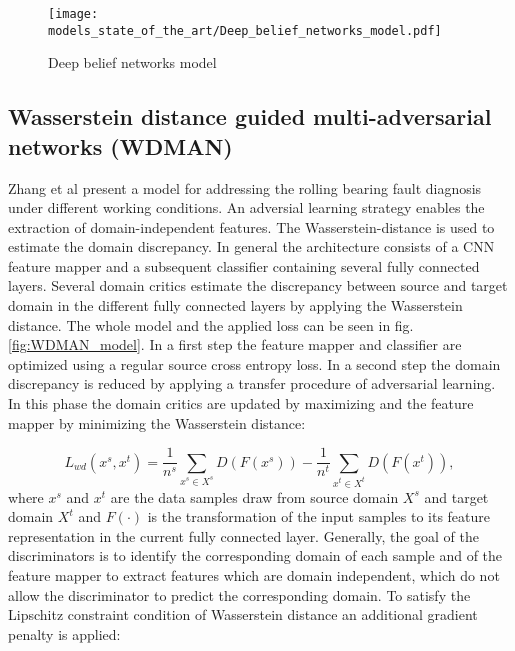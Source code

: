 {\begin{figure}[p]
  \centering
  \texttt{[image: models\_state\_of\_the\_art/Deep\_belief\_networks\_model.pdf]}
  \caption{Deep belief networks model \cite{Zhang2017}}
  \label{fig:Deep_belief_networks_model}
\end{figure}


\subsection{Wasserstein distance guided multi-adversarial networks (WDMAN)}
 Zhang et al \cite{Zhang2019} present a model for addressing the rolling bearing fault diagnosis under different working conditions. An adversial learning strategy enables the extraction of domain-independent features. The Wasserstein-distance is used to estimate the domain discrepancy. In general the architecture consists of a CNN feature mapper and a subsequent classifier containing several fully connected layers. Several domain critics estimate the discrepancy between source and target domain in the different fully connected layers by applying the Wasserstein distance. The whole model and the applied loss can be seen in fig. \ref{fig:WDMAN_model}. In a first step the feature mapper and classifier are optimized using a regular source cross entropy loss. In a second step the domain discrepancy is reduced by applying a transfer procedure of adversarial learning. In this phase the domain critics are updated by maximizing and the feature mapper by minimizing the Wasserstein distance: 
 
 \begin{equation}
     L_{wd}(x^{s}, x^{t}) = \frac{1}{n^{s}} \sum_{x^{s} \in X^{s}} D(F(x^{s})) - \frac{1}{n^{t}} \sum_{x^{t} \in X^{t}} D(F(x^{t})),
 \end{equation}
 where $x^{s}$ and $x^{t}$ are the data samples draw from
source domain $X^{s}$ and target domain $X^{t}$ and $F(\cdot)$ is the transformation of the input samples to its feature representation in the current fully connected layer. Generally, the goal of the discriminators is to identify the corresponding domain of each sample and of the feature mapper to extract features which are domain independent, which do not allow the discriminator to predict the corresponding domain. To satisfy the Lipschitz constraint condition of Wasserstein distance an additional gradient penalty is applied: 

}
